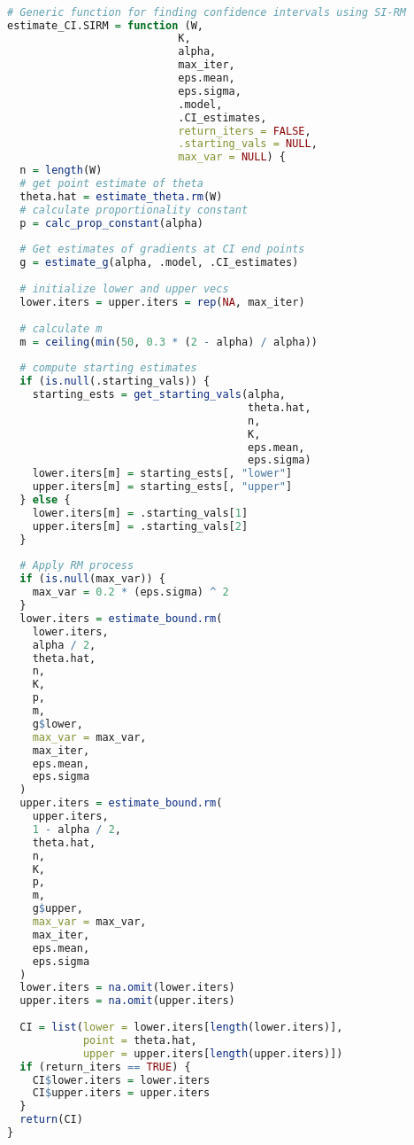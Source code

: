 \begin{lstlisting}[language=R, caption = {Code for implementing SI-RM.}]

# Generic function for finding confidence intervals using SI-RM
estimate_CI.SIRM = function (W,
                           K,
                           alpha,
                           max_iter,
                           eps.mean,
                           eps.sigma,
                           .model,
                           .CI_estimates,
                           return_iters = FALSE,
                           .starting_vals = NULL,
                           max_var = NULL) {
  n = length(W)
  # get point estimate of theta
  theta.hat = estimate_theta.rm(W)
  # calculate proportionality constant
  p = calc_prop_constant(alpha)
  
  # Get estimates of gradients at CI end points
  g = estimate_g(alpha, .model, .CI_estimates)
  
  # initialize lower and upper vecs
  lower.iters = upper.iters = rep(NA, max_iter)
  
  # calculate m
  m = ceiling(min(50, 0.3 * (2 - alpha) / alpha))
  
  # compute starting estimates
  if (is.null(.starting_vals)) {
    starting_ests = get_starting_vals(alpha,
                                      theta.hat,
                                      n,
                                      K,
                                      eps.mean,
                                      eps.sigma)
    lower.iters[m] = starting_ests[, "lower"]
    upper.iters[m] = starting_ests[, "upper"]
  } else {
    lower.iters[m] = .starting_vals[1]
    upper.iters[m] = .starting_vals[2]
  }
  
  # Apply RM process
  if (is.null(max_var)) {
    max_var = 0.2 * (eps.sigma) ^ 2
  }
  lower.iters = estimate_bound.rm(
    lower.iters,
    alpha / 2,
    theta.hat,
    n,
    K,
    p,
    m,
    g$lower,
    max_var = max_var,
    max_iter,
    eps.mean,
    eps.sigma
  )
  upper.iters = estimate_bound.rm(
    upper.iters,
    1 - alpha / 2,
    theta.hat,
    n,
    K,
    p,
    m,
    g$upper,
    max_var = max_var,
    max_iter,
    eps.mean,
    eps.sigma
  )
  lower.iters = na.omit(lower.iters)
  upper.iters = na.omit(upper.iters)
  
  CI = list(lower = lower.iters[length(lower.iters)],
            point = theta.hat,
            upper = upper.iters[length(upper.iters)])
  if (return_iters == TRUE) {
    CI$lower.iters = lower.iters
    CI$upper.iters = upper.iters
  }
  return(CI)
}


\end{lstlisting}
